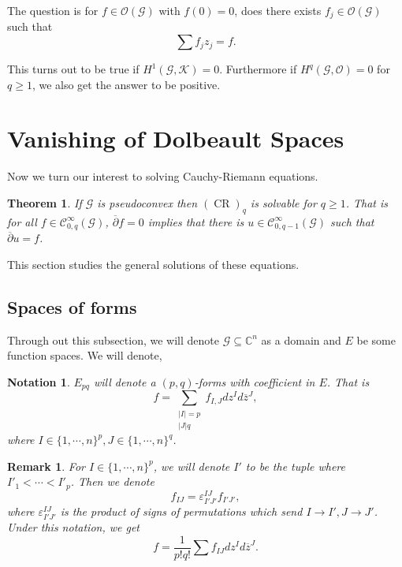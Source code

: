 \documentclass{article}
\newtheorem{theorem}{Theorem} [section]
\newtheorem{notation}{Notation}[section]
\newtheorem{remark}{Remark}[section]
\DeclareMathOperator{\CR}{CR}
\newcommand{\C}[0]{\mathbb{C}}
\newcommand{\G}[0]{\mathcal{G}}
\newcommand{\Ouv}[0]{\mathcal{O}}
\newcommand{\ck}[1]{\mathcal{C}^{#1}}
\newcommand{\cinf}[0]{\ck{\infty}}
\begin{document}
The question is for $f\in\Ouv(\mathcal{G})$ with $f(0)=0$, does there exists $f_j\in\Ouv(\G)$ such that 
\begin{equation*}
\sum f_jz_j = f.
\end{equation*}

This turns out to be true if $H^1(\G,\mathcal{K})=0$. Furthermore if $H^q(\G,\Ouv)=0$ for $q\geq1$, we also get the answer to be positive.


\section{Vanishing of Dolbeault Spaces}

Now we turn our interest to solving Cauchy-Riemann equations.

\begin{theorem}
  If $\G$ is pseudoconvex then $(\CR)_q$ is solvable for $q\geq1$. That is for all $f\in\cinf_{0,q}(\G)$, $\overline{\partial}f=0$ implies that there is $u\in\cinf_{0,q-1}(\G)$ such that $\overline{\partial}u = f$.
\end{theorem}

This section studies the general solutions of these equations.

\subsection{Spaces of forms}

Through out this subsection, we will denote $\G\subseteq\C^n$ as a domain and $E$ be some function spaces. We will denote, 
\begin{notation}
  $E_{pq}$ will denote a $(p,q)$-forms with coefficient in $E$. That is 
  \begin{equation*}
    f = \sum_{\substack{\vert I\vert=p\\\vert J\vert q}}f_{I,J}dz^Id\overline{z}^J,
  \end{equation*}
  where $I\in\{1,\cdots,n\}^p,J\in\{1,\cdots,n\}^q$. 
\end{notation}

\begin{remark}
  For $I\in\{1,\cdots,n\}^p$, we will denote $I'$ to be the tuple where $I'_1<\cdots<I'_p$. Then we denote
  \begin{equation*}
    f_{IJ} = \varepsilon_{I'J'}^{IJ} f_{I'J'},
  \end{equation*}
  where $\varepsilon_{I'J'}^{IJ}$ is the product of signs of permutations which send $I\to I',J\to J'$. Under this notation, we get
  \begin{equation*}
    f = {\frac 1 {p!q!}}\sum f_{IJ}dz^Id\overline{z}^J.
  \end{equation*}
\end{remark}
\end{document}
